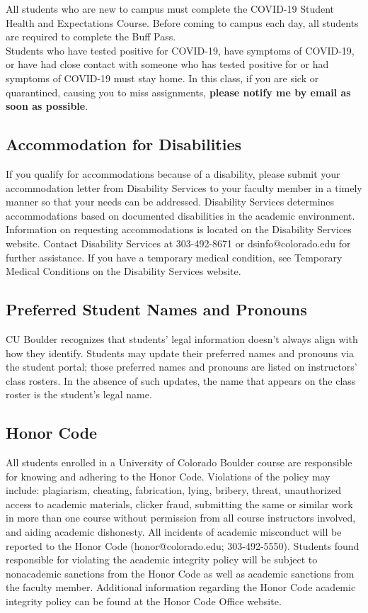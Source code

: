 \documentclass[9pt]{article}
\begin{document}
{All students who are new to campus must complete the COVID-19 Student Health and Expectations Course. Before coming to campus each day, all students are required to complete the Buff Pass.\\

Students who have tested positive for COVID-19, have symptoms of COVID-19, or have had close contact with someone who has tested positive for or had symptoms of COVID-19 must stay home. In this class, if you are sick or quarantined, causing you to miss assignments, \textbf{please notify me by email as soon as possible}.

\subsection*{Accommodation for Disabilities}

If you qualify for accommodations because of a disability, please submit your accommodation letter from Disability Services to your faculty member in a timely manner so that your needs can be addressed.  Disability Services determines accommodations based on documented disabilities in the academic environment.  Information on requesting accommodations is located on the Disability Services website. Contact Disability Services at 303-492-8671 or dsinfo@colorado.edu for further assistance.  If you have a temporary medical condition, see Temporary Medical Conditions on the Disability Services website.

\subsection*{Preferred Student Names and Pronouns}

CU Boulder recognizes that students' legal information doesn't always align with how they identify. Students may update their preferred names and pronouns via the student portal; those preferred names and pronouns are listed on instructors' class rosters. In the absence of such updates, the name that appears on the class roster is the student's legal name.

\subsection*{Honor Code}

All students enrolled in a University of Colorado Boulder course are responsible for knowing and adhering to the Honor Code. Violations of the policy may include: plagiarism, cheating, fabrication, lying, bribery, threat, unauthorized access to academic materials, clicker fraud, submitting the same or similar work in more than one course without permission from all course instructors involved, and aiding academic dishonesty. All incidents of academic misconduct will be reported to the Honor Code (honor@colorado.edu; 303-492-5550). Students found responsible for violating the academic integrity policy will be subject to nonacademic sanctions from the Honor Code as well as academic sanctions from the faculty member. Additional information regarding the Honor Code academic integrity policy can be found at the Honor Code Office website.

}
\end{document}
